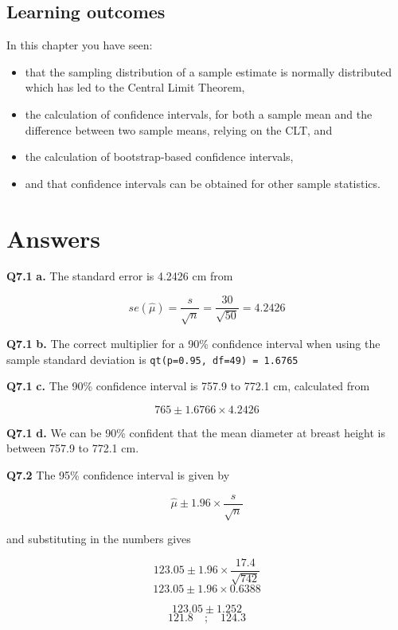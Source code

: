 \documentclass[
  oneside]{krantz}
\providecommand{\tightlist}{%
  \setlength{\itemsep}{0pt}\setlength{\parskip}{0pt}}
\begin{document}
\hypertarget{learning-outcomes-4}{%
\subsection{Learning outcomes}\label{learning-outcomes-4}}

In this chapter you have seen:

\begin{itemize}
\tightlist
\item
  that the sampling distribution of a sample estimate is normally distributed which has led to the Central Limit Theorem,
\item
  the calculation of confidence intervals, for both a sample mean and the difference between two sample means, relying on the CLT, and
\item
  the calculation of bootstrap-based confidence intervals,
\item
  and that confidence intervals can be obtained for other sample statistics.
\end{itemize}

\hypertarget{ANSci}{%
\section{Answers}\label{ANSci}}

\textbf{Q7.1} \textbf{a.} The standard error is 4.2426 cm from

\[se(\hat \mu) = \frac{s}{\sqrt{n}} = \frac{30}{\sqrt{50}} = 4.2426\]

\textbf{Q7.1} \textbf{b.} The correct multiplier for a 90\% confidence interval when using the sample standard deviation is \texttt{qt(p=0.95,\ df=49)\ =\ 1.6765}

\textbf{Q7.1} \textbf{c.} The 90\% confidence interval is 757.9 to 772.1 cm, calculated from

\[765 \pm 1.6766 \times 4.2426\]

\textbf{Q7.1} \textbf{d.} We can be 90\% confident that the mean diameter at breast height is between 757.9 to 772.1 cm.

\textbf{Q7.2} The 95\% confidence interval is given by

\[\hat \mu \pm 1.96 \times \frac{s}{\sqrt{n}}\]

and substituting in the numbers gives

\[123.05 \pm 1.96 \times \frac{17.4}{\sqrt{742}}\]
\[123.05 \pm 1.96 \times 0.6388\]

\[123.05 \pm 1.252 \]
\[121.8 \quad ; \quad 124.3\]
\end{document}
